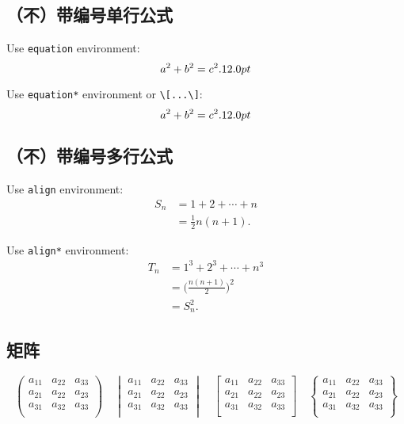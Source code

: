 \subsection{（不）带编号单行公式 \the\baselineskip}

Use \texttt{equation} environment: \the\baselineskip
\begin{equation}
    a^2 + b^2 = c^2. \the\baselineskip
\end{equation}
\the\baselineskip

Use \texttt{equation*} environment or \texttt{\textbackslash[...\textbackslash]}: \the\baselineskip
\[ a^2 + b^2 = c^2. \the\baselineskip\]
\the\baselineskip
\subsection{（不）带编号多行公式}

Use \texttt{align} environment:
\begin{align}
    S_n & = 1 + 2 + \cdots + n \\
        & = \frac12 n(n+1).
\end{align}

Use \texttt{align*} environment:
\begin{align*}
    T_n & = 1^3 + 2^3 + \cdots + n^3         \\
        & = \biggl(\frac{n(n+1)}{2}\biggr)^2 \\
        & = S_n^2.
\end{align*}

\subsection{矩阵}

\[
    \begin{pmatrix}
        a_{11} & a_{22} & a_{33} \\
        a_{21} & a_{22} & a_{23} \\
        a_{31} & a_{32} & a_{33} \\
    \end{pmatrix} \quad
    \begin{vmatrix}
        a_{11} & a_{22} & a_{33} \\
        a_{21} & a_{22} & a_{23} \\
        a_{31} & a_{32} & a_{33} \\
    \end{vmatrix} \quad
    \begin{bmatrix}
        a_{11} & a_{22} & a_{33} \\
        a_{21} & a_{22} & a_{23} \\
        a_{31} & a_{32} & a_{33} \\
    \end{bmatrix} \quad
    \begin{Bmatrix}
        a_{11} & a_{22} & a_{33} \\
        a_{21} & a_{22} & a_{23} \\
        a_{31} & a_{32} & a_{33} \\
    \end{Bmatrix}\]

